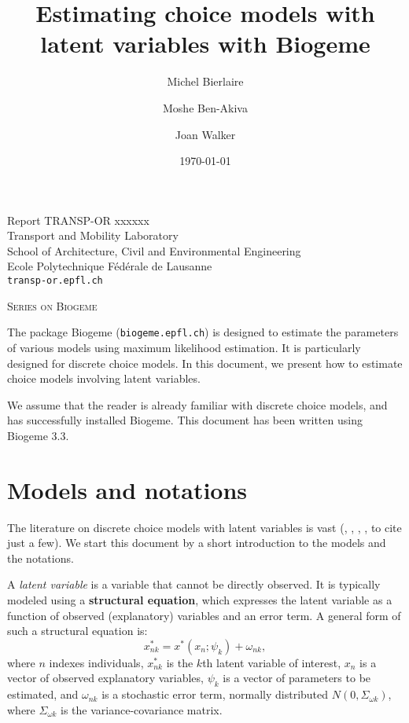 \documentclass[12pt,a4paper]{article}
\title{Estimating choice models with latent variables with Biogeme}
\author{Michel Bierlaire \and Moshe Ben-Akiva \and Joan Walker}
\date{\today}
\begin{document}
\begin{titlepage}
\pagestyle{empty}

\maketitle
\vspace{2cm}

\begin{center}
\small Report TRANSP-OR xxxxxx  \\ Transport and Mobility Laboratory \\ School of Architecture, Civil and Environmental Engineering \\ Ecole Polytechnique F\'ed\'erale de Lausanne \\ \verb+transp-or.epfl.ch+
\begin{center}
\textsc{Series on Biogeme}
\end{center}
\end{center}


\clearpage
\end{titlepage}


The package Biogeme (\texttt{biogeme.epfl.ch}) is designed to estimate
the parameters of various models using maximum likelihood
estimation. It is particularly designed for discrete choice
models.  In this document, we present how to estimate choice
models involving latent variables.

We assume that the reader is already familiar with discrete choice
models, and has successfully installed Biogeme. This document has
been written using Biogeme 3.3.



\section{Models and notations}

The literature on discrete choice models with latent variables is vast
(\cite{walker2001extended}, \cite{ashok2002extending},
\cite{greene2003latent}, \cite{ben2002integration}, to cite just a
few). We start this document by a short introduction to the models and
the notations. 

A \emph{latent variable} is a variable that cannot be directly
observed. It is typically modeled using a \textbf{structural
  equation}, which expresses the latent variable as a function of
observed (explanatory) variables and an error term. A general form of
such a structural equation is:
\begin{equation}
\label{eq:structural}
x_{nk}^* = x^*(x_n; \psi_k) + \omega_{nk},
\end{equation}
where $n$ indexes individuals, $x_{nk}^*$ is the $k$th latent variable of interest, $x_n$ is a vector of observed explanatory variables, $\psi_k$ is a vector of parameters to be estimated, and $\omega_{nk}$ is a stochastic error term, normally distributed $N(0, \Sigma_{\omega k})$, where $\Sigma_{\omega k}$ is the variance-covariance matrix.
\end{document}
